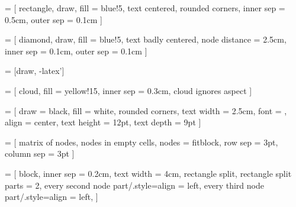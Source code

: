 
\setcounter{secnumdepth}{2}


\newenvironment{ctable}[2] {
\begin{table}[htbp]
  \caption{#1}
  \begin{center}
    \begin{tabular}{#2}
}
{
    \end{tabular}
  \end{center}
\end{table}
}


\usepackage{tikz}
\usepackage{pgfplots}
\usepackage{pgfplotstable}
\usepackage{tikzscale}
\usetikzlibrary{shapes, arrows, calc, positioning, fit, matrix}

 = [
    rectangle,
    draw,
    fill = blue!5,
    text centered,
    rounded corners,
    inner sep = 0.5cm,
    outer sep = 0.1cm
]

 = [
    diamond,
    draw,
    fill = blue!5,
    text badly centered,
    node distance = 2.5cm,
    inner sep = 0.1cm,
    outer sep = 0.1cm
]

 = [draw, -latex']

 = [
    cloud,
    fill = yellow!15,
    inner sep = 0.3cm,
    cloud ignores aspect
]

 = [
    draw = black,
    fill = white,
    rounded corners,
    text width = 2.5cm,
    font = {\sffamily\bfseries\color{black}},
    align = center,
    text height = 12pt,
    text depth = 9pt
]

 = [
    matrix of nodes,
    nodes in empty cells,
    nodes = {fitblock},
    row sep = 3pt,
    column sep = 3pt
]

 = [
    block,
    inner sep = 0.2cm,
    text width = 4cm,
    rectangle split,
    rectangle split parts = 2,
    every second node part/.style={align = left},
    every third node part/.style={align = left},
]


\newcommand{\spanblock}[3]{
    \node[
        fitblock,
        inner sep = 0pt,
        fit = {(#1) (#2)},
        label = center:{\sffamily\bfseries\color{black}#3}
    ] {};
}

